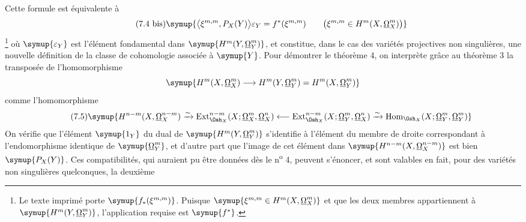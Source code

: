 Cette formule est équivalente à
\begin{equation}\tag{7.4 bis}
  \symup{\bigl\langle\xi^{m,m},P_X(Y)\bigr\rangle\varepsilon_Y
  =f^{*}(\xi^{m,m})
  \qquad
  \bigl(\xi^{m,m}\in H^{m}(X,\underline{\Omega}_X^{m})\bigr)}
\end{equation}
\footnote{Le texte imprimé porte $\symup{f_{*}(\xi^{m,m})}$. Puisque
$\symup{\xi^{m,m}\in H^{m}(X,\underline{\Omega}_X^{m})}$ et que les deux membres appartiennent à
$\symup{H^{m}(Y,\underline{\Omega}_Y^{m})}$, l'application requise est $\symup{f^{*}}$.} où
$\symup{\varepsilon_Y}$ est l'élément fondamental dans $\symup{H^{m}(Y,\underline{\Omega}_Y^{m})}$, et
constitue, dans le cas des variétés projectives non singulières, une nouvelle
définition de la classe de cohomologie associée à $\symup{Y}$. Pour démontrer le
théorème 4, on interprète grâce au théorème 3 la transposée de l'homomorphisme
\[
  \symup{H^{m}(X,\underline{\Omega}_X^{m})
  \longrightarrow H^{m}(Y,\underline{\Omega}_Y^{m})
  =H^{m}(X,\underline{\Omega}_Y^{m})}
\]
comme l'homomorphisme
\begin{equation}\tag{7.5}
\symup{H^{n-m}(X,\underline{\Omega}_X^{n-m})
  \xrightarrow{\sim}
  \operatorname{Ext}_{\Osh_X}^{n-m}(X;\underline{\Omega}_X^{m},\underline{\Omega}_X^{n})
  \longleftarrow
  \operatorname{Ext}_{\Osh_X}^{n-m}(X;\underline{\Omega}_Y^{m},\underline{\Omega}_X^{n})
  \xrightarrow{\sim}
  \operatorname{Hom}_{\Osh_X}(X;\underline{\Omega}_Y^{m},\underline{\Omega}_Y^{m})}
\end{equation}
On vérifie que l'élément $\symup{1_Y}$ du dual de $\symup{H^{m}(Y,\underline{\Omega}_Y^{m})}$ s'identifie
à l'élément du membre de droite correspondant à l'endomorphisme identique de
$\symup{\underline{\Omega}_Y^{m}}$, et d'autre part que l'image de cet élément dans
$\symup{H^{n-m}(X,\underline{\Omega}_X^{n-m})}$ est bien $\symup{P_X(Y)}$. Ces compatibilités, qui auraient
pu être données dès le n\textsuperscript{o} 4, peuvent s'énoncer, et sont
valables en fait, pour des variétés non singulières quelconques, la deuxième

